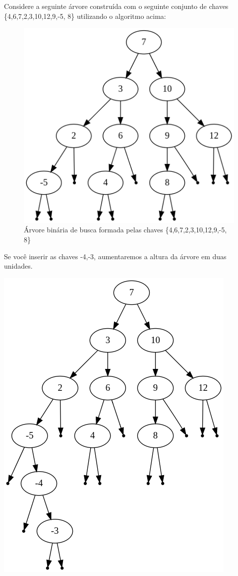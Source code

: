 Considere a seguinte árvore construída com o seguinte conjunto de chaves \{4,6,7,2,3,10,12,9,-5, 8\} utilizando o algoritmo acima:

\begin{figure}
    \centering
    \includegraphics[scale=0.5]{images/bst.png}

    \caption{Árvore binária de busca formada pelas chaves \{4,6,7,2,3,10,12,9,-5, 8\} }
    \label{fig::bst1}
\end{figure}

Se você inserir as chaves {-4,-3}, aumentaremos a altura da árvore em duas unidades.

\includegraphics[scale=0.5]{images/bst2.png}


